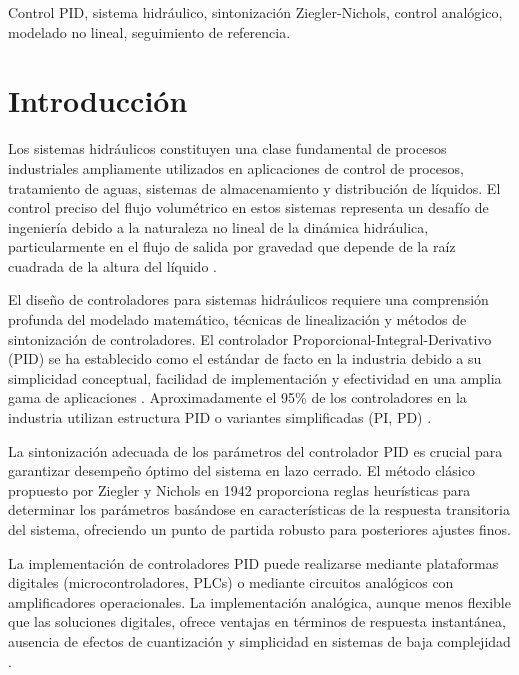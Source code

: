 \documentclass[conference]{IEEEtran}
\begin{document}
\begin{IEEEkeywords}
Control PID, sistema hidráulico, sintonización Ziegler-Nichols, control analógico, modelado no lineal, seguimiento de referencia.
\end{IEEEkeywords}

\section{Introducción}

Los sistemas hidráulicos constituyen una clase fundamental de procesos industriales ampliamente utilizados en aplicaciones de control de procesos, tratamiento de aguas, sistemas de almacenamiento y distribución de líquidos. El control preciso del flujo volumétrico en estos sistemas representa un desafío de ingeniería debido a la naturaleza no lineal de la dinámica hidráulica, particularmente en el flujo de salida por gravedad que depende de la raíz cuadrada de la altura del líquido \cite{ogata}.

El diseño de controladores para sistemas hidráulicos requiere una comprensión profunda del modelado matemático, técnicas de linealización y métodos de sintonización de controladores. El controlador Proporcional-Integral-Derivativo (PID) se ha establecido como el estándar de facto en la industria debido a su simplicidad conceptual, facilidad de implementación y efectividad en una amplia gama de aplicaciones \cite{astrom}. Aproximadamente el 95\% de los controladores en la industria utilizan estructura PID o variantes simplificadas (PI, PD) \cite{astrom}.

La sintonización adecuada de los parámetros del controlador PID es crucial para garantizar desempeño óptimo del sistema en lazo cerrado. El método clásico propuesto por Ziegler y Nichols en 1942 \cite{ziegler} proporciona reglas heurísticas para determinar los parámetros basándose en características de la respuesta transitoria del sistema, ofreciendo un punto de partida robusto para posteriores ajustes finos.

La implementación de controladores PID puede realizarse mediante plataformas digitales (microcontroladores, PLCs) o mediante circuitos analógicos con amplificadores operacionales. La implementación analógica, aunque menos flexible que las soluciones digitales, ofrece ventajas en términos de respuesta instantánea, ausencia de efectos de cuantización y simplicidad en sistemas de baja complejidad \cite{sedra}.
\end{document}
